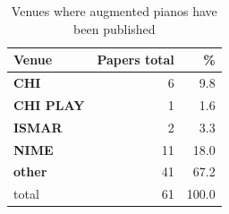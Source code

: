 \documentclass[sigconf, screen, review]{acmart}
\begin{document}
\begin{table}[h]
\centering
\caption{Venues where augmented pianos have been published}
\label{tab:venues}
\begin{tabular}{lrr}
Venue             & Papers total & \%    \\ \hline \hline
\textbf{CHI}      & 6           & 9.8   \\
\textbf{CHI PLAY} & 1           & 1.6   \\
\textbf{ISMAR}    & 2           & 3.3   \\
\textbf{NIME}     & 11          & 18.0  \\
\textbf{other}    & 41          & 67.2  \\ \hline
total             & 61          & 100.0 \\ 
\end{tabular}
\end{table}
\end{document}
